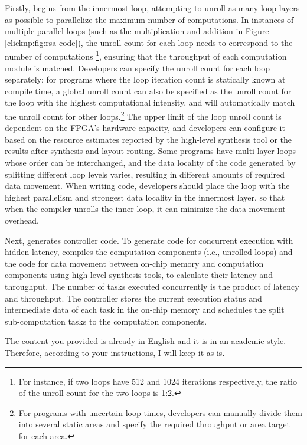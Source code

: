 Firstly, \name begins from the innermost loop, attempting to unroll as many loop layers as possible to parallelize the maximum number of computations. In instances of multiple parallel loops (such as the multiplication and addition in Figure \ref{clicknp:fig:rsa-code}), the unroll count for each loop needs to correspond to the number of computations \footnote{For instance, if two loops have 512 and 1024 iterations respectively, the ratio of the unroll count for the two loops is 1:2.}, ensuring that the throughput of each computation module is matched. Developers can specify the unroll count for each loop separately; for programs where the loop iteration count is statically known at compile time, a global unroll count can also be specified as the unroll count for the loop with the highest computational intensity, and \name will automatically match the unroll count for other loops.\footnote{For programs with uncertain loop times, developers can manually divide them into several static areas and specify the required throughput or area target for each area.} The upper limit of the loop unroll count is dependent on the FPGA's hardware capacity, and developers can configure it based on the resource estimates reported by the high-level synthesis tool or the results after synthesis and layout routing. Some programs have multi-layer loops whose order can be interchanged, and the data locality of the code generated by splitting different loop levels varies, resulting in different amounts of required data movement. When writing \name code, developers should place the loop with the highest parallelism and strongest data locality in the innermost layer, so that when the compiler unrolls the inner loop, it can minimize the data movement overhead.

Next, \name generates controller code. To generate code for concurrent execution with hidden latency, \name compiles the computation components (i.e., unrolled loops) and the code for data movement between on-chip memory and computation components using high-level synthesis tools, to calculate their latency and throughput. The number of tasks executed concurrently is the product of latency and throughput. The controller stores the current execution status and intermediate data of each task in the on-chip memory and schedules the split sub-computation tasks to the computation components.

The content you provided is already in English and it is in an academic style. Therefore, according to your instructions, I will keep it as-is.

